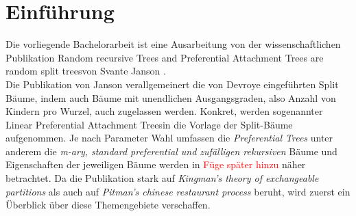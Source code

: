 \chapter*{Einführung}
Die vorliegende Bachelorarbeit ist eine Ausarbeitung von der wissenschaftlichen Publikation \glqq Random recursive Trees and Preferential Attachment Trees are random split trees\grqq von Svante Janson \cite{janson2019random}.\\
Die Publikation von Janson verallgemeinert die von Devroye \cite{devroye1998universal} eingeführten \glqq Split Bäume\grqq, indem auch Bäume mit unendlichen Ausgangsgraden, also Anzahl von Kindern pro Wurzel, auch zugelassen werden. Konkret, werden sogenannter \glqq Linear Preferential Attachment Trees\grqq in die Vorlage der Split-Bäume aufgenommen. Je nach Parameter Wahl umfassen die \textit{Preferential Trees} unter anderem die \textit{m-ary, standard preferential und zufälligen rekursiven} Bäume und Eigenschaften der jeweiligen Bäume werden in \textcolor{red}{Füge später hinzu} näher betrachtet. Da die Publikation stark auf \textit{Kingman's theory of exchangeable partitions} \cite{kingman1978representation,kingman1982coalescent} als auch auf \textit{Pitman's chinese restaurant process} \cite{pitman2006combinatorial,pitman1995exchangeable} beruht, wird zuerst ein Überblick über diese Themengebiete verschaffen.